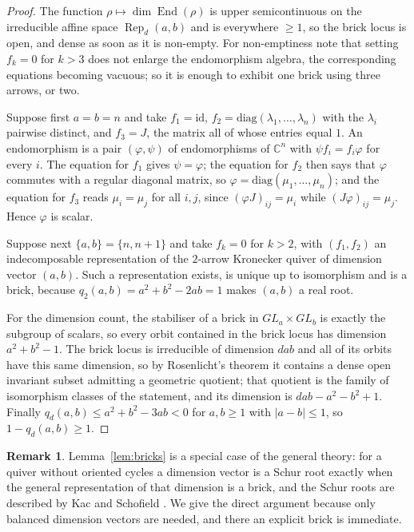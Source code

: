\documentclass{amsart}
\theoremstyle{definition}
\newtheorem{remark}[theorem]{Remark}
\newcommand{\CC}{\mathbb{C}}
\newcommand{\End}{\operatorname{End}}
\newcommand{\Rep}{\operatorname{Rep}}
\begin{document}
\begin{proof}
The function $\rho\mapsto\dim\End(\rho)$ is upper semicontinuous on the irreducible affine space $\Rep_d(a,b)$ and is everywhere $\ge1$, so the brick locus is open, and dense as soon as it is non-empty. For non-emptiness note that setting $f_{k}=0$ for $k>3$ does not enlarge the endomorphism algebra, the corresponding equations becoming vacuous; so it is enough to exhibit one brick using three arrows, or two.

Suppose first $a=b=n$ and take $f_1=\mathrm{id}$, $f_2=\mathrm{diag}(\lambda_1,\dots,\lambda_n)$ with the $\lambda_i$ pairwise distinct, and $f_3=J$, the matrix all of whose entries equal $1$. An endomorphism is a pair $(\varphi,\psi)$ of endomorphisms of $\CC^n$ with $\psi f_i=f_i\varphi$ for every $i$. The equation for $f_1$ gives $\psi=\varphi$; the equation for $f_2$ then says that $\varphi$ commutes with a regular diagonal matrix, so $\varphi=\mathrm{diag}(\mu_1,\dots,\mu_n)$; and the equation for $f_3$ reads $\mu_i=\mu_j$ for all $i,j$, since $(\varphi J)_{ij}=\mu_i$ while $(J\varphi)_{ij}=\mu_j$. Hence $\varphi$ is scalar.

Suppose next $\{a,b\}=\{n,n+1\}$ and take $f_k=0$ for $k>2$, with $(f_1,f_2)$ an indecomposable representation of the $2$-arrow Kronecker quiver of dimension vector $(a,b)$. Such a representation exists, is unique up to isomorphism and is a brick, because $q_2(a,b)=a^2+b^2-2ab=1$ makes $(a,b)$ a real root.

For the dimension count, the stabiliser of a brick in $GL_a\times GL_b$ is exactly the subgroup of scalars, so every orbit contained in the brick locus has dimension $a^2+b^2-1$. The brick locus is irreducible of dimension $dab$ and all of its orbits have this same dimension, so by Rosenlicht's theorem it contains a dense open invariant subset admitting a geometric quotient; that quotient is the family of isomorphism classes of the statement, and its dimension is $dab-a^2-b^2+1$. Finally $q_d(a,b)\le a^2+b^2-3ab<0$ for $a,b\ge1$ with $|a-b|\le1$, so $1-q_d(a,b)\ge1$.
\end{proof}

\begin{remark}
Lemma~\ref{lem:bricks} is a special case of the general theory: for a quiver without oriented cycles a dimension vector is a Schur root exactly when the general representation of that dimension is a brick, and the Schur roots are described by Kac \cite{Kac80} and Schofield \cite{Sch92}. We give the direct argument because only balanced dimension vectors are needed, and there an explicit brick is immediate.
\end{remark}
\end{document}
